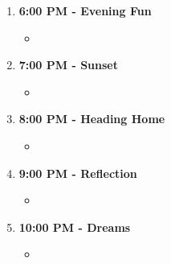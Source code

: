 \documentclass{article}
\begin{document}
\begin{enumerate}
\begin{itemize}
\item %
\end{itemize}
\item \textbf{6:00 PM - Evening Fun}
\begin{itemize}
\item %
\end{itemize}
\item \textbf{7:00 PM - Sunset}
\begin{itemize}
\item %
\end{itemize}
\item \textbf{8:00 PM - Heading Home}
\begin{itemize}
\item %
\end{itemize}
\item \textbf{9:00 PM - Reflection}
\begin{itemize}
\item %
\end{itemize}
\item \textbf{10:00 PM - Dreams}
\begin{itemize}
\item %

\end{itemize}

\end{enumerate}
\end{document}
